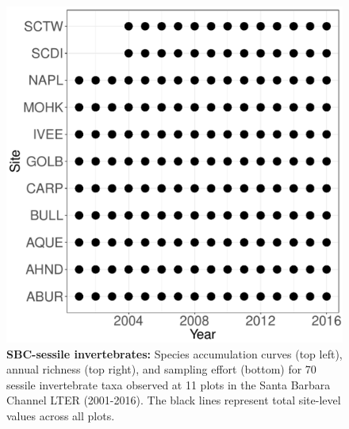 \documentclass[11pt, oneside]{article}
\begin{document}
\begin{figure}[h!]
\includegraphics[scale = 0.4]{sbc-sessileInverts-castorani_spatiotemporal_sampling_effort.pdf}
\caption{{\bf SBC-sessile invertebrates:} Species accumulation curves (top left),  annual richness (top right), and sampling effort (bottom)  for 70 sessile invertebrate taxa observed at 11 plots in the Santa Barbara Channel LTER (2001-2016). The black lines represent total site-level values across all plots.}
\label{sbc-sessileInverts}
\end{figure}
\end{document}
